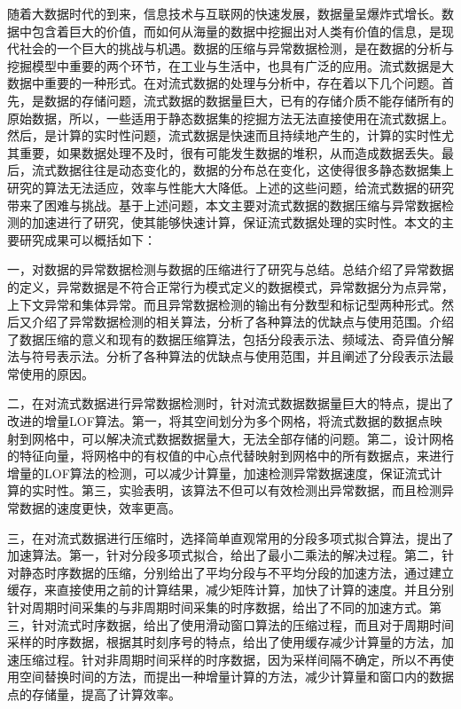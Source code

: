 

\begin{conclusion}

随着大数据时代的到来，信息技术与互联网的快速发展，数据量呈爆炸式增长。数据中包含着巨大的价值，而如何从海量的数据中挖掘出对人类有价值的信息，是现代社会的一个巨大的挑战与机遇。数据的压缩与异常数据检测，是在数据的分析与挖掘模型中重要的两个环节，在工业与生活中，也具有广泛的应用。流式数据是大数据中重要的一种形式。在对流式数据的处理与分析中，存在着以下几个问题。首先，是数据的存储问题，流式数据的数据量巨大，已有的存储介质不能存储所有的原始数据，所以，一些适用于静态数据集的挖掘方法无法直接使用在流式数据上。然后，是计算的实时性问题，流式数据是快速而且持续地产生的，计算的实时性尤其重要，如果数据处理不及时，很有可能发生数据的堆积，从而造成数据丢失。最后，流式数据往往是动态变化的，数据的分布总在变化，这使得很多静态数据集上研究的算法无法适应，效率与性能大大降低。上述的这些问题，给流式数据的研究带来了困难与挑战。基于上述问题，本文主要对流式数据的数据压缩与异常数据检测的加速进行了研究，使其能够快速计算，保证流式数据处理的实时性。本文的主要研究成果可以概括如下：

一，对数据的异常数据检测与数据的压缩进行了研究与总结。总结介绍了异常数据的定义，异常数据是不符合正常行为模式定义的数据模式，异常数据分为点异常，上下文异常和集体异常。而且异常数据检测的输出有分数型和标记型两种形式。然后又介绍了异常数据检测的相关算法，分析了各种算法的优缺点与使用范围。介绍了数据压缩的意义和现有的数据压缩算法，包括分段表示法、频域法、奇异值分解法与符号表示法。分析了各种算法的优缺点与使用范围，并且阐述了分段表示法最常使用的原因。

二，在对流式数据进行异常数据检测时，针对流式数据数据量巨大的特点，提出了改进的增量LOF算法。第一，将其空间划分为多个网格，将流式数据的数据点映射到网格中，可以解决流式数据数据量大，无法全部存储的问题。第二，设计网格的特征向量，将网格中的有权值的中心点代替映射到网格中的所有数据点，来进行增量的LOF算法的检测，可以减少计算量，加速检测异常数据速度，保证流式计算的实时性。第三，实验表明，该算法不但可以有效检测出异常数据，而且检测异常数据的速度更快，效率更高。

三，在对流式数据进行压缩时，选择简单直观常用的分段多项式拟合算法，提出了加速算法。第一，针对分段多项式拟合，给出了最小二乘法的解决过程。第二，针对静态时序数据的压缩，分别给出了平均分段与不平均分段的加速方法，通过建立缓存，来直接使用之前的计算结果，减少矩阵计算，加快了计算的速度。并且分别针对周期时间采集的与非周期时间采集的时序数据，给出了不同的加速方式。第三，针对流式时序数据，给出了使用滑动窗口算法的压缩过程，而且对于周期时间采样的时序数据，根据其时刻序号的特点，给出了使用缓存减少计算量的方法，加速压缩过程。针对非周期时间采样的时序数据，因为采样间隔不确定，所以不再使用空间替换时间的方法，而提出一种增量计算的方法，减少计算量和窗口内的数据点的存储量，提高了计算效率。

\end{conclusion}